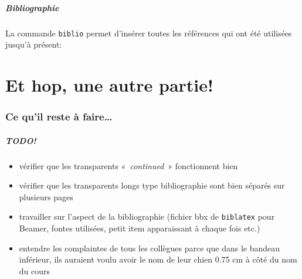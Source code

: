 \documentclass[fr,biblatex,outline]{isae-slides}
\begin{document}
\begin{frame}
\frametitle{Bibliographie}

La commande \lstinline!biblio! permet d'insérer toutes les références
qui ont été utilisées jusqu'à présent:

\nocite{mittelbach04:_latex}
\biblio{}

\end{frame}

\part<presentation>[Autre partie pour voir]{Et hop, une autre partie!}

\section{Ce qu'il reste à faire\ldots}
\label{sec:todo}

\begin{frame}
\frametitle{TODO!}

\begin{itemize}
\item vérifier que les transparents «~\textit{continued}~»
  fonctionnent bien
\item vérifier que les transparents longs type bibliographie sont bien
  séparés sur plusieurs pages
\item travailler sur l'aspect de la bibliographie (fichier bbx de
  \texttt{biblatex} pour Beamer, fontes utilisées, petit item
  apparaissant à chaque fois etc.)
\item entendre les complaintes de tous les collègues parce que dans le
  bandeau inférieur, ils auraient voulu avoir le nom de leur chien
  0.75 cm à côté du nom du cours \smiley

\end{itemize}

\end{frame}
\end{document}
